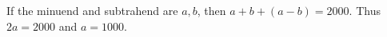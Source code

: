 If the minuend and subtrahend are $a,b$, then $a+b+(a-b)=2000$. Thus $2a=2000$ and $a=\boxed{1000}$.
